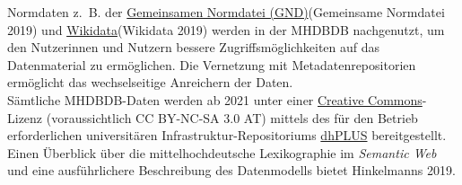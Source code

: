 \documentclass{article}
\begin{document}
        Normdaten z. B. der \href{http://gams.uni-graz.at/o:konde.109}{Gemeinsamen
                     Normdatei (GND)}(Gemeinsame Normdatei 2019) und \href{http://gams.uni-graz.at/o:konde.112}{Wikidata}(Wikidata 2019) werden in der MHDBDB nachgenutzt, um den Nutzerinnen
                  und Nutzern bessere Zugriffsmöglichkeiten auf das Datenmaterial zu ermöglichen.
                  Die Vernetzung mit Metadatenrepositorien ermöglicht das wechselseitige Anreichern
                  der Daten.\\
            
        Sämtliche MHDBDB-Daten werden ab 2021 unter einer \href{http://gams.uni-graz.at/o:konde.45}{Creative Commons}-Lizenz (voraussichtlich CC BY-NC-SA
                  3.0 AT) mittels des für den Betrieb erforderlichen universitären
                  Infrastruktur-Repositoriums \href{http://gams.uni-graz.at/o:konde.68}{dhPLUS}
                  bereitgestellt. Einen Überblick über die mittelhochdeutsche Lexikographie im \emph{Semantic Web} und eine ausführlichere Beschreibung des
                  Datenmodells bietet Hinkelmanns 2019.\\
            
\end{document}
